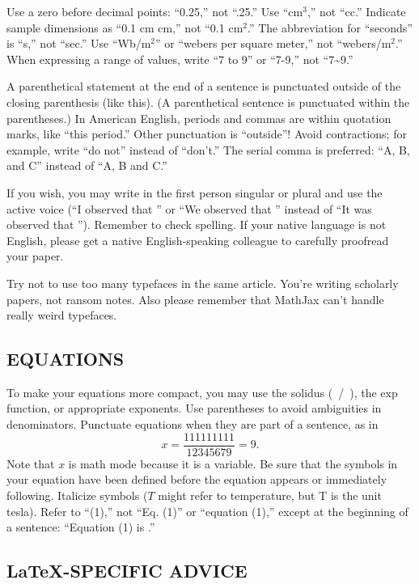 \documentclass{ieeeojpel}
\begin{document}
Use a zero before decimal points: ``0.25,'' not ``.25.'' Use ``cm$^3$,'' not 
``cc.'' Indicate sample dimensions as ``0.1 cm  cm,'' not 
``0.1  cm$^{2}$.'' The abbreviation for ``seconds'' is ``s,'' 
not ``sec.'' Use ``Wb/m$^{2}$'' or ``webers per square meter,'' not 
``webers/m$^2$.'' When expressing a range of values, write ``7 to 9'' or 
``7-9,'' not ``7\textasciitilde 9.''

A parenthetical statement at the end of a sentence is punctuated outside of 
the closing parenthesis (like this). (A parenthetical sentence is punctuated 
within the parentheses.) In American English, periods and commas are within 
quotation marks, like ``this period.'' Other punctuation is ``outside''! 
Avoid contractions; for example, write ``do not'' instead of ``don't.'' The 
serial comma is preferred: ``A, B, and C'' instead of ``A, B and C.''

If you wish, you may write in the first person singular or plural and use 
the active voice (``I observed that \textellipsis'' or ``We observed that \textellipsis'' 
instead of ``It was observed that \textellipsis''). Remember to check spelling. If 
your native language is not English, please get a native English-speaking 
colleague to carefully proofread your paper.

Try not to use too many typefaces in the same article. You're writing
scholarly papers, not ransom notes. Also please remember that MathJax
can't handle really weird typefaces.

\subsection{EQUATIONS}
To make your equations more 
compact, you may use the solidus (~/~), the exp function, or appropriate 
exponents. Use parentheses to avoid ambiguities in denominators. Punctuate 
equations when they are part of a sentence, as in
\begin{equation}
\label{eq1}
x=\frac{111111111}{12345679}=9 .
\end{equation}
Note that $x$ is math mode because it is a variable. 
Be sure that the symbols in your equation have been defined before the 
equation appears or immediately following. Italicize symbols ($T$ might refer 
to temperature, but T is the unit tesla). Refer to ``(1),'' not ``Eq. (1)'' 
or ``equation (1),'' except at the beginning of a sentence: ``Equation (1) 
is \textellipsis .''

\subsection{\LaTeX-SPECIFIC ADVICE}
\end{document}
